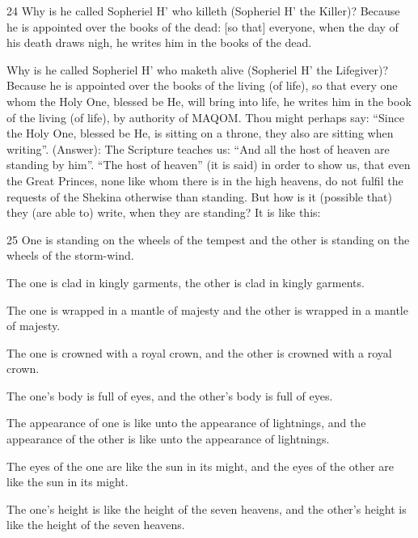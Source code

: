 \par 24 Why is he called Sopheriel H' who killeth (Sopheriel H' the Killer)? Because he is appointed over the books of the dead: [so that] everyone, when the day of his death draws nigh, he writes him in the books of the dead. 

\par Why is he called Sopheriel H' who maketh alive (Sopheriel H' the Lifegiver)? Because he is appointed over the books of the living (of life), so that every one whom the Holy One, blessed be He, will bring into life, he writes him in the book of the living (of life), by authority of MAQOM. Thou might perhaps say: “Since the Holy One, blessed be He, is sitting on a throne, they also are sitting when writing”. (Answer): The Scripture teaches us: “And all the host of heaven are standing by him”. “The host of heaven” (it is said) in order to show us, that even the Great Princes, none like whom there is in the high heavens, do not fulfil the requests of the Shekina otherwise than standing. But how is it (possible that) they (are able to) write, when they are standing? It is like this: 

\par 25 One is standing on the wheels of the tempest and the other is standing on the wheels of the storm-wind. 

\par The one is clad in kingly garments, the other is clad in kingly garments. 

\par The one is wrapped in a mantle of majesty and the other is wrapped in a mantle of majesty. 

\par The one is crowned with a royal crown, and the other is crowned with a royal crown. 

\par The one's body is full of eyes, and the other's body is full of eyes. 

\par The appearance of one is like unto the appearance of lightnings, and the appearance of the other is like unto the appearance of lightnings. 

\par The eyes of the one are like the sun in its might, and the eyes of the other are like the sun in its might. 

\par The one's height is like the height of the seven heavens, and the other's height is like the height of the seven heavens. 

